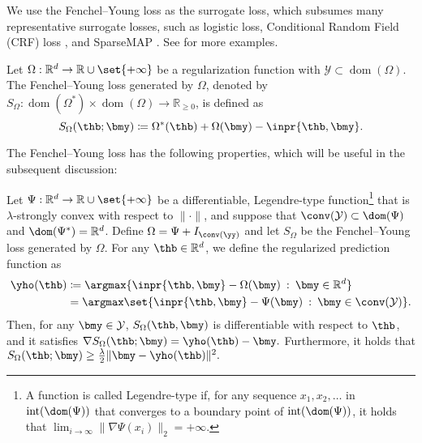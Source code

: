 We use the Fenchel--Young loss \citep{JMLR_2020_blondel} as the surrogate loss, which subsumes many representative surrogate losses, such as logistic loss, Conditional Random Field (CRF) loss \citep{lafferty01conditional}, and SparseMAP \citep{Niculae18sparse}.
See \citet[Table 1]{JMLR_2020_blondel} for more examples. 
\begin{definition}
    \label{def: Fenchel--Young Loss}
    Let $\Omega:\mathbb{R}^d\rightarrow\mathbb{R}\cup\set{+\infty}$ be a regularization function with $\mathcal{Y}\subset\operatorname{dom}(\Omega)$.  
    The Fenchel--Young loss generated by $\Omega$, denoted by $S_\Omega:\operatorname{dom}(\Omega^\ast)\times\operatorname{dom}(\Omega)\rightarrow\mathbb{R}_{\geq0}$, is defined as
    \[
    S_{\Omega}(\thb;\bmy)\coloneqq\Omega^\ast(\thb)+\Omega(\bmy)-\inpr{\thb,\bmy}.
    \]
\end{definition}
The Fenchel--Young loss has the following properties, which will be useful in the subsequent discussion:
\begin{proposition}
    \label{prop:fenchel}
    Let $\Psi:\mathbb{R}^d\rightarrow\mathbb{R}\cup\set{+\infty}$ be a differentiable, Legendre-type function\footnote{
    A function is called Legendre-type if, for any sequence $x_1,x_2,\hdots$ in $\operatorname{int}(\dom(\Psi))$ that converges to a boundary point of $\operatorname{int}(\dom(\Psi))$, it holds that $\lim_{i\rightarrow\infty}\|\nabla\Psi(x_i)\|_2=+\infty$.}  
    that is $\lambda$-strongly convex with respect to $\|\cdot\|$, and suppose that $\conv(\mathcal{Y})\subset\dom(\Psi)$ and $\dom(\Psi^\ast)=\mathbb{R}^d$.  
    Define $\Omega=\Psi+I_{\conv(\yy)}$ and let $S_\Omega$ be the Fenchel--Young loss generated by $\Omega$.  
    For any $\thb\in\mathbb{R}^d$, we define the regularized prediction function as 
    \begin{align*}
        \yho(\thb)&\coloneqq\argmax\{\inpr{\thb,\bmy}-\Omega(\bmy)\::\:\bmy\in\mathbb{R}^d\}\\
        &=\argmax\set{\inpr{\thb,\bmy}-\Psi(\bmy)\::\:\bmy\in\conv(\mathcal{Y})}.
    \end{align*}
    Then, for any $\bmy\in\mathcal{Y}$, $S_\Omega(\thb,\bmy)$ is differentiable with respect to $\thb$, and it satisfies  
    $
    \nabla S_\Omega(\thb;\bmy)=\yho(\thb)-\bmy.
    $
    Furthermore, it holds that  
    $
    S_\Omega(\thb;\bmy)\geq\frac{\lambda}{2}\|\bmy-\yho(\thb)\|^2.
    $ 
\end{proposition}


